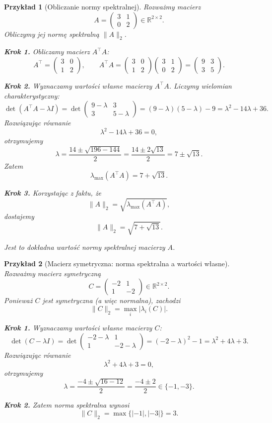 \documentclass[10pt,a4paper]{article}
\newtheorem*{example}{Przykład}
\begin{document}
\begin{example}[Obliczanie normy spektralnej]
Rozważmy macierz
\[
A=\begin{pmatrix}
3 & 1\\
0 & 2
\end{pmatrix}\in\mathbb{R}^{2\times 2}.
\]
Obliczymy jej normę spektralną $\|A\|_2$.

\medskip
\noindent
\textbf{Krok 1.} Obliczamy macierz $A^\top A$:
\[
A^\top=\begin{pmatrix}
3 & 0\\
1 & 2
\end{pmatrix},
\qquad
A^\top A=
\begin{pmatrix}
3 & 0\\
1 & 2
\end{pmatrix}
\begin{pmatrix}
3 & 1\\
0 & 2
\end{pmatrix}
=
\begin{pmatrix}
9 & 3\\
3 & 5
\end{pmatrix}.
\]

\medskip
\noindent
\textbf{Krok 2.} Wyznaczamy wartości własne macierzy $A^\top A$. Liczymy wielomian charakterystyczny:
\[
\det(A^\top A-\lambda I)=
\det\begin{pmatrix}
9-\lambda & 3\\
3 & 5-\lambda
\end{pmatrix}
=(9-\lambda)(5-\lambda)-9
=\lambda^2-14\lambda+36.
\]
Rozwiązując równanie
\[
\lambda^2-14\lambda+36=0,
\]
otrzymujemy
\[
\lambda=\frac{14\pm\sqrt{196-144}}{2}
=\frac{14\pm 2\sqrt{13}}{2}
=7\pm\sqrt{13}.
\]
Zatem
\[
\lambda_{\max}(A^\top A)=7+\sqrt{13}.
\]

\medskip
\noindent
\textbf{Krok 3.} Korzystając z faktu, że
\[
\|A\|_2=\sqrt{\lambda_{\max}(A^\top A)},
\]
dostajemy
\[
\|A\|_2=\sqrt{7+\sqrt{13}}.
\]

\medskip
\noindent
Jest to dokładna wartość normy spektralnej macierzy $A$.
\end{example}

\begin{example}[Macierz symetryczna: norma spektralna a wartości własne]
Rozważmy macierz symetryczną
\[
C=\begin{pmatrix}
-2 & 1\\
1 & -2
\end{pmatrix}\in\mathbb{R}^{2\times 2}.
\]
Ponieważ $C$ jest symetryczna (a więc normalna), zachodzi
\[
\|C\|_2=\max_i |\lambda_i(C)|.
\]

\medskip
\noindent
\textbf{Krok 1.} Wyznaczamy wartości własne macierzy $C$:
\[
\det(C-\lambda I)
=
\det\begin{pmatrix}
-2-\lambda & 1\\
1 & -2-\lambda
\end{pmatrix}
=
(-2-\lambda)^2-1
=
\lambda^2+4\lambda+3.
\]
Rozwiązując równanie
\[
\lambda^2+4\lambda+3=0,
\]
otrzymujemy
\[
\lambda=\frac{-4\pm\sqrt{16-12}}{2}
=\frac{-4\pm 2}{2}
\in\{-1,-3\}.
\]

\medskip
\noindent
\textbf{Krok 2.} Zatem norma spektralna wynosi
\[
\|C\|_2=\max\{|-1|,|-3|\}=3.
\]

\medskip
\end{example}
\end{document}
